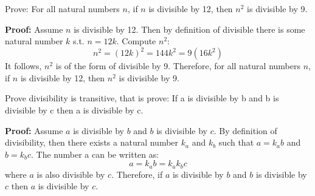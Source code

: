 \documentclass[12pt,addpoints]{exam}
\begin{document}
\begin{questions}
\question[10] Prove: For all natural numbers $n$, if $n$ is divisible by
12, then $n^2$ is divisible by 9.
    \begin{solution} \textbf{Proof:} Assume $n$ is divisible by 12.
    Then by definition of divisible there is some natural number $k$
    s.t. $n=12k$. Compute $n^2$:
    \[ n^2 = (12k)^2 = 144k^2 = 9(16k^2) \]
    It follows, $n^2$ is of the form of divisible by 9.  Therefore,
    for all natural numbers $n$, if $n$ is divisible by 12, then
    $n^2$ is divisible by 9.
    \end{solution}

\question[10] Prove divisibility is transitive, that is prove: If a is divisible by b and b is divisible by c then a is divisible by c.

    \begin{solution}
    \textbf{Proof:} Assume $a$ is divisible by $b$ and $b$ is divisible by $c$. By definition of divisibility, then there exists a natural number $k_a$ and $k_b$ such that $a = k_ab$ and $b = k_bc$.  The number a can be written as:
    $$ a = k_a b = k_a k_b c$$
    where $a$ is also divisible by $c$.  Therefore, if $a$ is divisible by $b$ and $b$ is divisible by $c$ then $a$ is divisible by $c$.
    \end{solution}


\end{questions}
\end{document}
